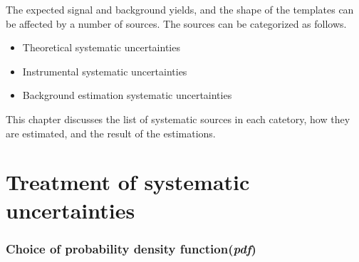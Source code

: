 
The expected signal and background yields, 
and the shape of the templates can be affected by a number of sources. 
The sources can be categorized as follows. 
\begin{itemize} 
\item Theoretical systematic uncertainties  
\item Instrumental systematic uncertainties  
\item Background estimation systematic uncertainties  
\end{itemize}  
This chapter discusses the list of systematic sources in each catetory, 
how they are estimated, and the result of the estimations. 


\section{Treatment of systematic uncertainties}
 
\subsubsection{Choice of probability density function(\textit{pdf})}

